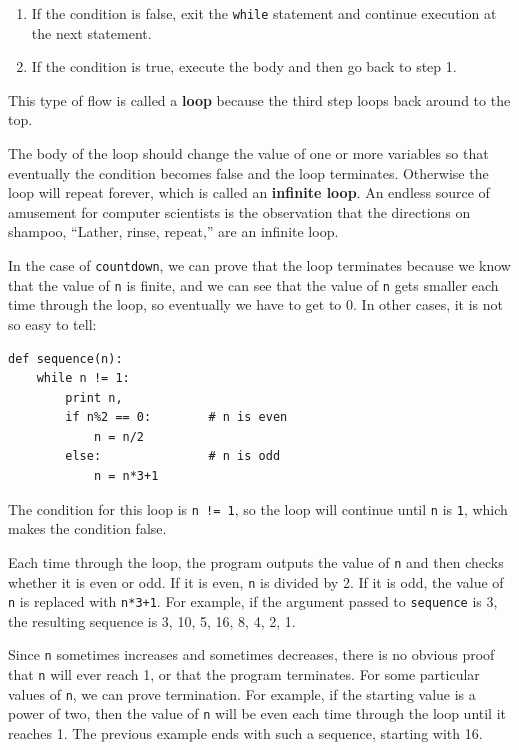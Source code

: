 \documentclass[10pt]{book}
\begin{document}
\begin{CJK}{UTF8}{gbsn}
\begin{enumerate}
\item If the condition is false, exit the {\tt while} statement
and continue execution at the next statement.

\item If the condition is true, execute the
body and then go back to step 1.

\end{enumerate}

This type of flow is called a {\bf loop} because the third step
loops back around to the top.  

The body of the loop should change the value of one or more variables
so that eventually the condition becomes false and the loop
terminates.  Otherwise the loop will repeat forever, which is called
an {\bf infinite loop}.  An endless source of amusement for computer
scientists is the observation that the directions on shampoo,
``Lather, rinse, repeat,'' are an infinite loop.

In the case of {\tt countdown}, we can prove that the loop
terminates because we know that the value of {\tt n} is finite, and we
can see that the value of {\tt n} gets smaller each time through the
loop, so eventually we have to get to 0.  In other
cases, it is not so easy to tell:

\begin{verbatim}
def sequence(n):
    while n != 1:
        print n,
        if n%2 == 0:        # n is even
            n = n/2
        else:               # n is odd
            n = n*3+1
\end{verbatim}
%
The condition for this loop is {\tt n != 1}, so the loop will continue
until {\tt n} is {\tt 1}, which makes the condition false.

Each time through the loop, the program outputs the value of {\tt n}
and then checks whether it is even or odd.  If it is even, {\tt n} is 
divided by 2.  If it is odd, the value of {\tt n} is replaced with
{\tt n*3+1}. For example, if the argument passed
to {\tt sequence} is 3, the resulting sequence is 3, 10, 5, 16, 8, 4, 2, 1.

Since {\tt n} sometimes increases and sometimes decreases, there is no
obvious proof that {\tt n} will ever reach 1, or that the program
terminates.  For some particular values of {\tt n}, we can prove
termination.  For example, if the starting value is a power of two,
then the value of {\tt n} will be even each time through the loop
until it reaches 1. The previous example ends with such a sequence,
starting with 16.


\end{CJK}
\end{document}
